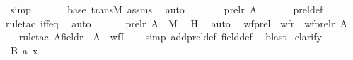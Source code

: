 \begin{isabellebody}
\ simp\ \isanewline
\ \ \ \ \isamarkupfalse%
\ base\ transM\ assms\ \isamarkupfalse%
\ auto\isanewline
\ \ \isamarkupfalse%
\ \isamarkupfalse%
\ {\isachardoublequoteopen}{\isachardot}{\kern0pt}{\isachardot}{\kern0pt}{\isachardot}{\kern0pt}\ {\isacharequal}{\kern0pt}\ prel{\isacharparenleft}{\kern0pt}r{\isacharcomma}{\kern0pt}\ A{\isacharparenright}{\kern0pt}{\isachardoublequoteclose}\ \isanewline
\ \ \ \ \isamarkupfalse%
\ prel{\isacharunderscore}{\kern0pt}def\ \isamarkupfalse%
{\isacharparenleft}{\kern0pt}rule{\isacharunderscore}{\kern0pt}tac\ iff{\isacharunderscore}{\kern0pt}eq{\isacharparenright}{\kern0pt}\ \isamarkupfalse%
\ auto\ \isanewline
\ \ \isamarkupfalse%
\ \isamarkupfalse%
\ {\isachardoublequoteopen}prel{\isacharparenleft}{\kern0pt}r{\isacharcomma}{\kern0pt}\ A{\isacharparenright}{\kern0pt}\ {\isasymin}\ M{\isachardoublequoteclose}\ \isamarkupfalse%
\ H\ \isamarkupfalse%
\ auto\ \isanewline
{}\isamarkupfalse%
%
\endisatagproof
{\isafoldproof}%
%
\isadelimproof
\isanewline
%
\endisadelimproof
\isanewline
{}\isamarkupfalse%
\ wf{\isacharunderscore}{\kern0pt}prel\ {\isacharcolon}{\kern0pt}\ {\isachardoublequoteopen}wf{\isacharparenleft}{\kern0pt}r{\isacharparenright}{\kern0pt}\ {\isasymLongrightarrow}\ wf{\isacharparenleft}{\kern0pt}prel{\isacharparenleft}{\kern0pt}r{\isacharcomma}{\kern0pt}\ A{\isacharparenright}{\kern0pt}{\isacharparenright}{\kern0pt}{\isachardoublequoteclose}\ \isanewline
%
\isadelimproof
\ \ %
\endisadelimproof
%
\isatagproof
{}\isamarkupfalse%
{\isacharparenleft}{\kern0pt}rule{\isacharunderscore}{\kern0pt}tac\ A{\isacharequal}{\kern0pt}{\isachardoublequoteopen}{\isacharparenleft}{\kern0pt}field{\isacharparenleft}{\kern0pt}r{\isacharparenright}{\kern0pt}\ {\isasymtimes}\ A{\isacharparenright}{\kern0pt}{\isachardoublequoteclose}\ \ wfI{\isacharparenright}{\kern0pt}\ \isanewline
\ \ \isamarkupfalse%
{\isacharparenleft}{\kern0pt}simp\ add{\isacharcolon}{\kern0pt}prel{\isacharunderscore}{\kern0pt}def\ field{\isacharunderscore}{\kern0pt}def{\isacharparenright}{\kern0pt}\ \isamarkupfalse%
\ blast\ \isanewline
{}\isamarkupfalse%
{\isacharparenleft}{\kern0pt}clarify{\isacharparenright}{\kern0pt}\ \isanewline
\ \ \isamarkupfalse%
\ B\ a\ x\isanewline
\ \ \isamarkupfalse%

\end{isabellebody}
